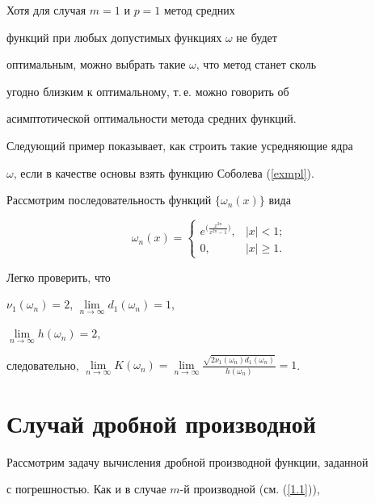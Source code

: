 Хотя для случая $m=1$ и $p=1$ метод средних


функций при любых допустимых функциях $\omega$ не будет


оптимальным, можно выбрать такие $\omega$, что метод станет сколь


угодно близким к оптимальному, т.\,е. можно говорить об


асимптотической оптимальности метода средних функций.





Следующий пример показывает, как строить такие усредняющие ядра


$\omega$, если в качестве основы взять функцию Соболева (\ref{exmpl}).





Рассмотрим последовательность функций $\{\omega_n(x)\}$ вида


$$


\omega_n(x)=


\begin{cases}


e^{\big(\frac{x^{2n}}{x^{2n}-1}\big)}, & |x|<1; \\


0, & |x|\geq 1.


\end{cases}


$$


Легко проверить, что


$\nu_1(\omega_n)=2$, $\lim\limits_{n\rightarrow\infty}d_1(\omega_n)=1$,


$\lim\limits_{n\rightarrow\infty}h(\omega_n)=2$,


следовательно, $\lim\limits_{n\rightarrow\infty}


K(\omega_n)=\lim\limits_{n\rightarrow\infty}\frac{\sqrt{2\nu_1(\omega_n)


d_1(\omega_n)}}{h(\omega_n)}=1$.





\section{Случай дробной производной}





Рассмотрим задачу вычисления дробной производной функции, заданной


с погрешностью. Как и в случае $m$-й производной (см. (\ref{1.1})),


